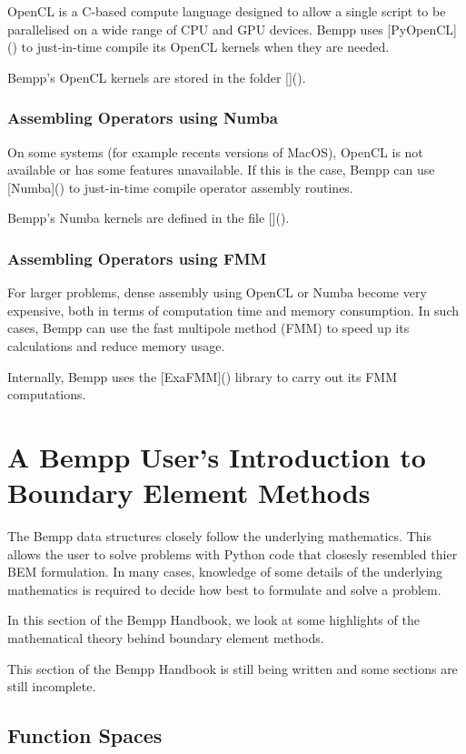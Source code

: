 \documentclass[a4paper]{book}
\begin{document}
OpenCL is a C-based compute language designed to allow a single script to be parallelised on
a wide range of CPU and GPU devices. Bempp uses [PyOpenCL]()
to just-in-time compile its OpenCL kernels when they are needed.

Bempp's OpenCL kernels are stored in the folder []().


\section{Assembling Operators using Numba}

On some systems (for example recents versions of MacOS), OpenCL is not available or has some features
unavailable. If this is the case, Bempp can use [Numba]()
to just-in-time compile operator assembly routines.

Bempp's Numba kernels are defined in the file []().


\section{Assembling Operators using FMM}

For larger problems, dense assembly using OpenCL or Numba become very expensive, both in terms of
computation time and memory consumption. In such cases, Bempp can use the fast multipole method (FMM)
to speed up its calculations and reduce memory usage.

Internally, Bempp uses the [ExaFMM]() library to carry out its FMM computations.


\part{A Bempp User's Introduction to Boundary Element Methods}


The Bempp data structures closely follow the underlying mathematics.
This allows the user to solve problems with Python code that closesly resembled thier
BEM formulation. In many cases, knowledge of some details of the underlying mathematics
is required to decide how best to formulate and solve a problem.

In this section of the Bempp Handbook, we look at some highlights of the mathematical theory
behind boundary element methods.

This section of the Bempp Handbook is still being written and some sections are still incomplete.


\chapter{Function Spaces}
\end{document}

